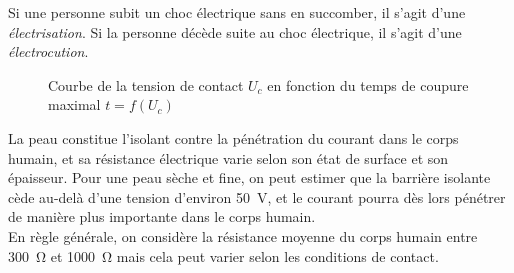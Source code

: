 \documentclass[a4paper, 11pt, twoside, fleqn]{memoir}
\begin{document}
Si une personne subit un choc électrique sans en succomber, il s'agit d'une \emph{électrisation}. Si la personne décède suite au choc électrique, il s'agit d'une \emph{électrocution}.

\begin{figure}[H]
\caption{Courbe de la tension de contact $U_c$ en fonction du temps de coupure maximal $t=f(U_c)$\label{graph:tension_contact_temps}}
\begin{center}
\end{center}
\end{figure}

La peau constitue l'isolant contre la pénétration du courant dans le corps humain, et sa résistance électrique varie selon son état de surface et son épaisseur. Pour une peau sèche et fine, on peut estimer que la barrière isolante cède au-delà d'une tension d'environ \SI{50}{\volt}, et le courant pourra dès lors pénétrer de manière plus importante dans le corps humain.\\
En règle générale, on considère la résistance moyenne du corps humain entre \SI{300}{\ohm} et \SI{1000}{\ohm} mais cela peut varier selon les conditions de contact.\supercite{Delahaye2015}
\end{document}
